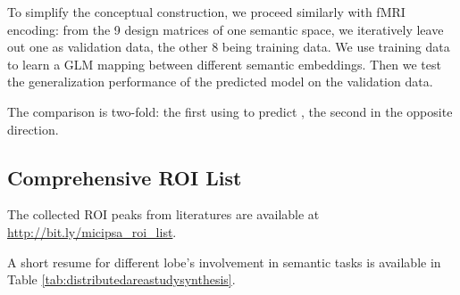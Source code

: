 To simplify the conceptual construction, we proceed similarly with fMRI encoding: from the 9 design matrices of one semantic space, we iteratively leave out one as validation data, the other 8 being training data. We use training data to learn a GLM mapping between different semantic embeddings. Then we test the generalization performance of the predicted model on the validation data. 

The comparison is two-fold: the first using  to predict , the second in the opposite direction.


\subsection{Comprehensive ROI List}
\label{appsubsc:roilist}

The collected ROI peaks from literatures are available at \url{http://bit.ly/micipsa_roi_list}.

A short resume for different lobe's involvement in semantic tasks is available in Table \ref{tab:distributedareastudysynthesis}.



